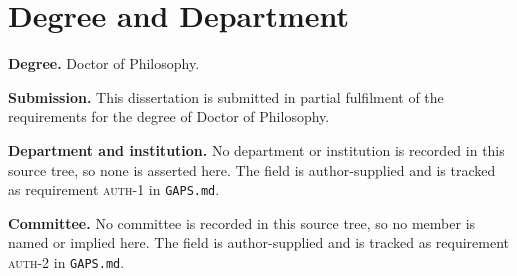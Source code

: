 \chapter*{Degree and Department}

\noindent
\textbf{Degree.} Doctor of Philosophy.

\medskip
\noindent
\textbf{Submission.} This dissertation is submitted in partial fulfilment of the
requirements for the degree of Doctor of Philosophy.

\medskip
\noindent
\textbf{Department and institution.} No department or institution is recorded in
this source tree, so none is asserted here. The field is author-supplied and is
tracked as requirement \textsc{auth-1} in \texttt{GAPS.md}.

\medskip
\noindent
\textbf{Committee.} No committee is recorded in this source tree, so no member is
named or implied here. The field is author-supplied and is tracked as requirement
\textsc{auth-2} in \texttt{GAPS.md}.
